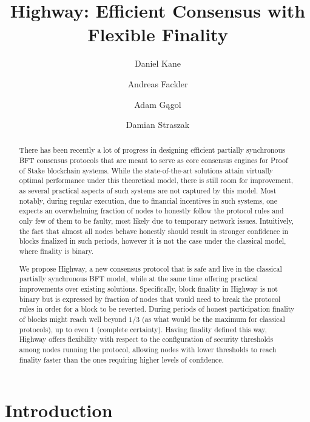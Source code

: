 \documentclass[12pt, fleqn]{article}
\title{Highway: Efficient Consensus with Flexible Finality}
\author[1]{Daniel Kane}
\author[2]{Andreas Fackler}
\author[3]{Adam Gągol}
\author[4]{Damian Straszak}
\affil[1]{Computer Science and Engineering Department, UC San Diego}
\affil[2]{CasperLabs LLC}
\affil[3,4]{Cardinal Cryptography}
\begin{document}
\maketitle

\begin{abstract}
There has been recently a lot of progress in designing efficient partially synchronous BFT consensus protocols that are meant to serve as core consensus engines for Proof of Stake blockchain systems.
% 
While the state-of-the-art solutions attain virtually optimal performance under this theoretical model, there is still room for improvement, as several practical aspects of such systems are not captured by this model.
%
Most notably, during regular execution, due to financial incentives in such systems, one expects an overwhelming fraction of nodes to honestly follow the protocol rules and only few of them to be faulty, most likely due to temporary network issues.
%
Intuitively, the fact that almost all nodes behave honestly should result in stronger confidence in blocks finalized in such periods, however it is not the case under the classical model, where finality is binary.
%

We propose Highway, a new consensus protocol that is safe and live in the classical partially synchronous BFT model, while at the same time offering practical improvements over existing solutions.
%
Specifically, block finality in Highway is not binary but is expressed by fraction of nodes that would need to break the protocol rules in order for a block to be reverted.
%
During periods of honest participation finality of blocks might reach well beyond $1/3$ (as what would be the maximum for classical protocols), up to even $1$ (complete certainty).
%
Having finality defined this way, Highway offers flexibility with respect to the configuration of security thresholds among nodes running the protocol, allowing nodes with lower thresholds to reach finality faster than the ones requiring higher levels of confidence.

\end{abstract}

\section{Introduction}
\end{document}
